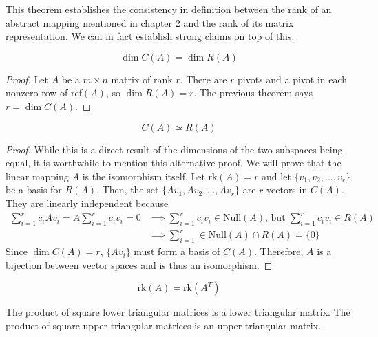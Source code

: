   This theorem establishes the consistency in definition between the rank of an abstract mapping mentioned in chapter 2 and the rank of its matrix representation. We can in fact establish strong claims on top of this. 

  \begin{theorem} 
    \begin{equation}
      \dim C(A) = \dim R(A)
    \end{equation}
  \end{theorem}
  \begin{proof}
    Let $A$ be a $m \times n$ matrix of rank $r$. There are $r$ pivots and a pivot in each nonzero row of ref$(A)$, so $\dim R(A) = r$. The previous theorem says $r = \dim C(A)$. 
  \end{proof}

  \begin{corollary}
    \begin{equation}
      C(A) \simeq R(A)
    \end{equation}
  \end{corollary}
  \begin{proof}
    While this is a direct result of the dimensions of the two subspaces being equal, it is worthwhile to mention this alternative proof. We will prove that the linear mapping $A$ is the isomorphism itself. Let rk$(A) = r$ and let $\{ v_1, v_2, ..., v_r\}$ be a basis for $R(A)$. Then, the set $\{ A v_1, A v_2, ..., A v_r\}$ are $r$ vectors in $C(A)$. They are linearly independent because 
    \begin{align*}
      \sum_{i = 1}^r c_i A v_i = A \sum_{i=1}^r c_i v_i = 0 & \implies \sum_{i=1}^r c_i v_i \in \text{Null}(A) \text{, but } \sum_{i=1}^r c_i v_i \in R(A) \\
      & \implies \sum_{i=1}^r \in \text{Null}(A) \cap R(A) = \{0\}
    \end{align*} 
    Since $\dim C(A) = r$, $\{A v_i\}$ must form a basis of $C(A)$. Therefore, $A$ is a bijection between vector spaces and is thus an isomorphism. 
  \end{proof}

  \begin{corollary}
    \begin{equation}
      \text{rk}(A) = \text{rk}(A^T)
    \end{equation}
  \end{corollary}

  \begin{theorem}
    The product of square lower triangular matrices is a lower triangular matrix. The product of square upper triangular matrices is an upper triangular matrix. 
  \end{theorem}

